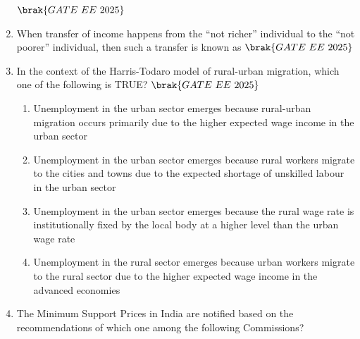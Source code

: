 \documentclass[journal,12pt,onecolumn]{IEEEtran}
\theoremstyle{remark}
\begin{document}
\begin{enumerate}
     \hfill $\brak{GATE\ EE\ 2025}$
    \begin{enumerate}
  \end{enumerate}
\item When transfer of income happens from the ``not richer'' individual to the ``not poorer'' individual, then such a transfer is known as
\hfill $\brak{GATE\ EE\ 2025}$
    \begin{enumerate}
      \end{enumerate}
\item In the context of the Harris-Todaro model of rural-urban migration, which one of the following is TRUE?
\hfill $\brak{GATE\ EE\ 2025}$
    \begin{enumerate}
    \item Unemployment in the urban sector emerges because rural-urban migration occurs primarily due to the higher expected wage income in the urban sector
    \item Unemployment in the urban sector emerges because rural workers migrate to the cities and towns due to the expected shortage of unskilled labour in the urban sector
    \item Unemployment in the urban sector emerges because the rural wage rate is institutionally fixed by the local body at a higher level than the urban wage rate
    \item Unemployment in the rural sector emerges because urban workers migrate to the rural sector due to the higher expected wage income in the advanced economies
  \end{enumerate}
\item The Minimum Support Prices in India are notified based on the recommendations of which one among the following Commissions?

\end{enumerate}
\end{document}
